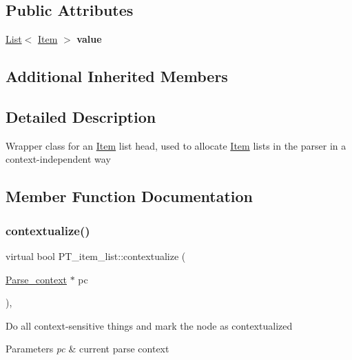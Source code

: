 \subsection*{Public Attributes}
\begin{DoxyCompactItemize}
\item 
\mbox{\label{classPT__item__list_a8f77474dee6e60fd438d2c9bb9ec4a31}} 
\mbox{\hyperlink{classList}{List}}$<$ \mbox{\hyperlink{classItem}{Item}} $>$ {\bfseries value}
\end{DoxyCompactItemize}
\subsection*{Additional Inherited Members}


\subsection{Detailed Description}
Wrapper class for an \mbox{\hyperlink{classItem}{Item}} list head, used to allocate \mbox{\hyperlink{classItem}{Item}} lists in the parser in a context-\/independent way 

\subsection{Member Function Documentation}
\mbox{\label{classPT__item__list_a5ddeca0fe325bc50ddcf4bd17da8efa8}} 
\subsubsection{\texorpdfstring{contextualize()}{contextualize()}}
{\footnotesize\ttfamily virtual bool P\+T\+\_\+item\+\_\+list\+::contextualize (\begin{DoxyParamCaption}\item[{\mbox{\hyperlink{structParse__context}{Parse\+\_\+context}} $\ast$}]{pc }\end{DoxyParamCaption})\hspace{0.3cm}{\ttfamily [inline]}, {\ttfamily [virtual]}}

Do all context-\/sensitive things and mark the node as contextualized


\begin{DoxyParams}{Parameters}
{\em pc} & current parse context\\
\hline
\end{DoxyParams}

